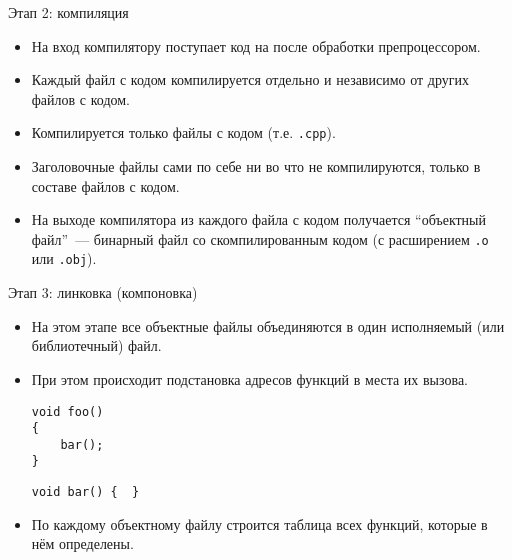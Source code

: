 \documentclass{beamer}
\begin{document}
\begin{frame}[fragile]{Этап 2: компиляция}
\begin{itemize}
    \item На вход компилятору поступает код на \langcpp после обработки
        препроцессором.
        
    \item Каждый файл с кодом компилируется отдельно и независимо от других
        файлов с кодом.
        
    \item Компилируется только файлы с кодом (т.е. {\tt *.cpp}).
        
    \item Заголовочные файлы сами по себе ни во что не компилируются, только в
        составе файлов с кодом.
        
    \item На выходе компилятора из каждого файла с кодом получается ``объектный
        файл''~--- бинарный файл со скомпилированным кодом (с расширением
        \texttt{.o} или \texttt{.obj}).

\end{itemize}
\end{frame}


\begin{frame}[fragile]{Этап 3: линковка (компоновка)}
\begin{itemize}
    \item На этом этапе все объектные файлы объединяются в один исполняемый 
        (или библиотечный) файл.

    \item При этом происходит подстановка адресов функций в места их вызова.
    \begin{lstlisting}
void foo()
{
    bar();
}
\end{lstlisting}

\begin{lstlisting}
void bar() {  }
\end{lstlisting}

    \item По каждому объектному файлу строится таблица всех
        функций, которые в нём определены.
\end{itemize}
\end{frame}
\end{document}
